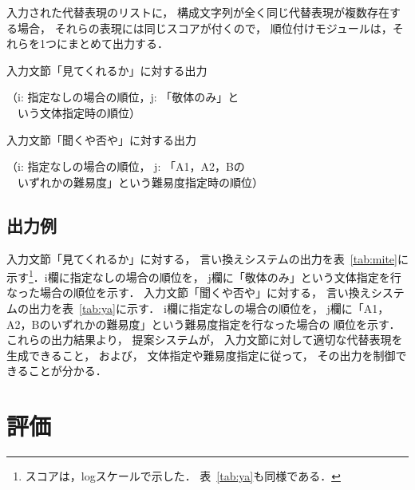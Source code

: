 \documentclass[japanese]{jnlp_1.4}
\begin{document}
入力された代替表現のリストに，
構成文字列が全く同じ代替表現が複数存在する場合，
それらの表現には同じスコアが付くので，
順位付けモジュールは，それらを1つにまとめて出力する．


\begin{table}[b]
\begin{minipage}{0.5\textwidth}
\caption{入力文節「見てくれるか」に対する出力 }
\vspace{-0.5\baselineskip}
（i: 指定なしの場合の順位，j: 「敬体のみ」と\\　いう文体指定時の順位）\\[-0.5zw]
\label{tab:mite}

\end{minipage}
\begin{minipage}{0.5\textwidth}
\caption{入力文節「聞くや否や」に対する出力}
\vspace{-0.5\baselineskip}
（i: 指定なしの場合の順位，
j: 「A1，A2，Bの\\　いずれかの難易度」という難易度指定時の順位）\\[-0.5zw]
\label{tab:ya}

\end{minipage}
\end{table}

\subsection{出力例}

入力文節「見てくれるか」に対する，
言い換えシステムの出力を表~\ref{tab:mite}に示す\footnote{
	スコアは，logスケールで示した．
	表~\ref{tab:ya}も同様である．
}．i欄に指定なしの場合の順位を，
j欄に「敬体のみ」という文体指定を行なった場合の順位を示す．
入力文節「聞くや否や」に対する，
言い換えシステムの出力を表~\ref{tab:ya}に示す．
i欄に指定なしの場合の順位を，
j欄に「A1，A2，Bのいずれかの難易度」という難易度指定を行なった場合の
順位を示す．
これらの出力結果より，
提案システムが，
入力文節に対して適切な代替表現を生成できること，
および，
文体指定や難易度指定に従って，
その出力を制御できることが分かる．




\section{評価}
\label{sec:evaluate}
\end{document}
